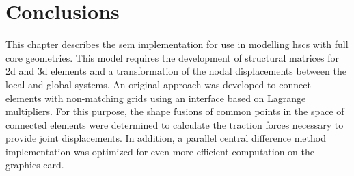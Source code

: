 \section{Conclusions}
\label{sec:conclusionsSEM}
This chapter describes the \ac{sem} implementation for use in modelling \acp{hsc} with full core geometries.
This model requires the development of structural matrices for \ac{2d} and \ac{3d} elements and a transformation of the nodal displacements between the local and global systems.
An original approach was developed to connect elements with non-matching grids using an interface based on Lagrange multipliers.
For this purpose, the shape fusions of common points in the space of connected elements were determined to calculate the traction forces necessary to provide joint displacements.
In addition, a parallel central difference method implementation was optimized for even more efficient computation on the graphics card.
